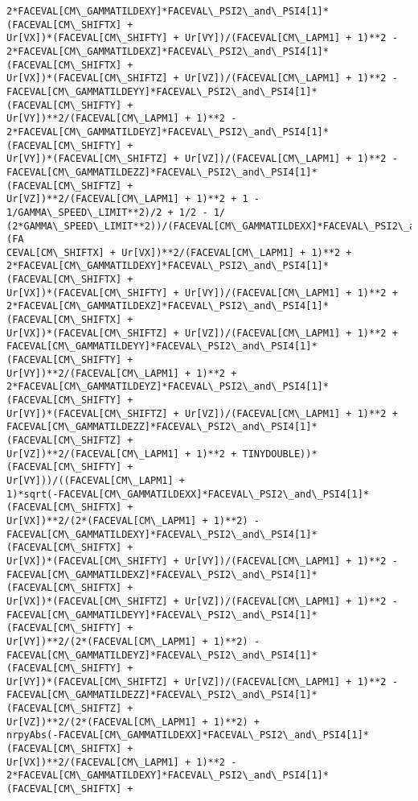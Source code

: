 \documentclass[landscape,letterpaper,10pt,english]{article}
\begin{document}
\begin{Verbatim}[commandchars=\\\{\}]
2*FACEVAL[CM\_GAMMATILDEXY]*FACEVAL\_PSI2\_and\_PSI4[1]*(FACEVAL[CM\_SHIFTX] +
Ur[VX])*(FACEVAL[CM\_SHIFTY] + Ur[VY])/(FACEVAL[CM\_LAPM1] + 1)**2 -
2*FACEVAL[CM\_GAMMATILDEXZ]*FACEVAL\_PSI2\_and\_PSI4[1]*(FACEVAL[CM\_SHIFTX] +
Ur[VX])*(FACEVAL[CM\_SHIFTZ] + Ur[VZ])/(FACEVAL[CM\_LAPM1] + 1)**2 -
FACEVAL[CM\_GAMMATILDEYY]*FACEVAL\_PSI2\_and\_PSI4[1]*(FACEVAL[CM\_SHIFTY] +
Ur[VY])**2/(FACEVAL[CM\_LAPM1] + 1)**2 -
2*FACEVAL[CM\_GAMMATILDEYZ]*FACEVAL\_PSI2\_and\_PSI4[1]*(FACEVAL[CM\_SHIFTY] +
Ur[VY])*(FACEVAL[CM\_SHIFTZ] + Ur[VZ])/(FACEVAL[CM\_LAPM1] + 1)**2 -
FACEVAL[CM\_GAMMATILDEZZ]*FACEVAL\_PSI2\_and\_PSI4[1]*(FACEVAL[CM\_SHIFTZ] +
Ur[VZ])**2/(FACEVAL[CM\_LAPM1] + 1)**2 + 1 - 1/GAMMA\_SPEED\_LIMIT**2)/2 + 1/2 - 1/
(2*GAMMA\_SPEED\_LIMIT**2))/(FACEVAL[CM\_GAMMATILDEXX]*FACEVAL\_PSI2\_and\_PSI4[1]*(FA
CEVAL[CM\_SHIFTX] + Ur[VX])**2/(FACEVAL[CM\_LAPM1] + 1)**2 +
2*FACEVAL[CM\_GAMMATILDEXY]*FACEVAL\_PSI2\_and\_PSI4[1]*(FACEVAL[CM\_SHIFTX] +
Ur[VX])*(FACEVAL[CM\_SHIFTY] + Ur[VY])/(FACEVAL[CM\_LAPM1] + 1)**2 +
2*FACEVAL[CM\_GAMMATILDEXZ]*FACEVAL\_PSI2\_and\_PSI4[1]*(FACEVAL[CM\_SHIFTX] +
Ur[VX])*(FACEVAL[CM\_SHIFTZ] + Ur[VZ])/(FACEVAL[CM\_LAPM1] + 1)**2 +
FACEVAL[CM\_GAMMATILDEYY]*FACEVAL\_PSI2\_and\_PSI4[1]*(FACEVAL[CM\_SHIFTY] +
Ur[VY])**2/(FACEVAL[CM\_LAPM1] + 1)**2 +
2*FACEVAL[CM\_GAMMATILDEYZ]*FACEVAL\_PSI2\_and\_PSI4[1]*(FACEVAL[CM\_SHIFTY] +
Ur[VY])*(FACEVAL[CM\_SHIFTZ] + Ur[VZ])/(FACEVAL[CM\_LAPM1] + 1)**2 +
FACEVAL[CM\_GAMMATILDEZZ]*FACEVAL\_PSI2\_and\_PSI4[1]*(FACEVAL[CM\_SHIFTZ] +
Ur[VZ])**2/(FACEVAL[CM\_LAPM1] + 1)**2 + TINYDOUBLE))*(FACEVAL[CM\_SHIFTY] +
Ur[VY]))/((FACEVAL[CM\_LAPM1] +
1)*sqrt(-FACEVAL[CM\_GAMMATILDEXX]*FACEVAL\_PSI2\_and\_PSI4[1]*(FACEVAL[CM\_SHIFTX] +
Ur[VX])**2/(2*(FACEVAL[CM\_LAPM1] + 1)**2) -
FACEVAL[CM\_GAMMATILDEXY]*FACEVAL\_PSI2\_and\_PSI4[1]*(FACEVAL[CM\_SHIFTX] +
Ur[VX])*(FACEVAL[CM\_SHIFTY] + Ur[VY])/(FACEVAL[CM\_LAPM1] + 1)**2 -
FACEVAL[CM\_GAMMATILDEXZ]*FACEVAL\_PSI2\_and\_PSI4[1]*(FACEVAL[CM\_SHIFTX] +
Ur[VX])*(FACEVAL[CM\_SHIFTZ] + Ur[VZ])/(FACEVAL[CM\_LAPM1] + 1)**2 -
FACEVAL[CM\_GAMMATILDEYY]*FACEVAL\_PSI2\_and\_PSI4[1]*(FACEVAL[CM\_SHIFTY] +
Ur[VY])**2/(2*(FACEVAL[CM\_LAPM1] + 1)**2) -
FACEVAL[CM\_GAMMATILDEYZ]*FACEVAL\_PSI2\_and\_PSI4[1]*(FACEVAL[CM\_SHIFTY] +
Ur[VY])*(FACEVAL[CM\_SHIFTZ] + Ur[VZ])/(FACEVAL[CM\_LAPM1] + 1)**2 -
FACEVAL[CM\_GAMMATILDEZZ]*FACEVAL\_PSI2\_and\_PSI4[1]*(FACEVAL[CM\_SHIFTZ] +
Ur[VZ])**2/(2*(FACEVAL[CM\_LAPM1] + 1)**2) +
nrpyAbs(-FACEVAL[CM\_GAMMATILDEXX]*FACEVAL\_PSI2\_and\_PSI4[1]*(FACEVAL[CM\_SHIFTX] +
Ur[VX])**2/(FACEVAL[CM\_LAPM1] + 1)**2 -
2*FACEVAL[CM\_GAMMATILDEXY]*FACEVAL\_PSI2\_and\_PSI4[1]*(FACEVAL[CM\_SHIFTX] +

\end{Verbatim}
\end{document}
